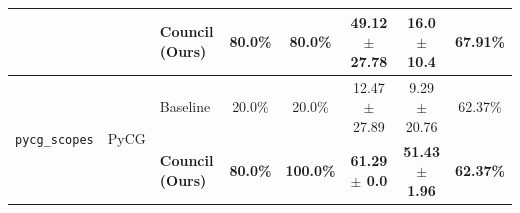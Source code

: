 \begin{table}[t]
\begin{tabular}{lll c c c c c}
 & & \textbf{Council (Ours)} & \textbf{80.0\%} & \textbf{80.0\%} & \textbf{49.12 $\pm$ 27.78} & \textbf{16.0 $\pm$ 10.4} & \textbf{67.91\%} \\
\midrule
\multirow{2}{*}{\texttt{pycg\_scopes}} & \multirow{2}{*}{PyCG} & Baseline & 20.0\% & 20.0\% & 12.47 $\pm$ 27.89 & 9.29 $\pm$ 20.76 & 62.37\% \\
 & & \textbf{Council (Ours)} & \textbf{80.0\%} & \textbf{100.0\%} & \textbf{61.29 $\pm$ 0.0} & \textbf{51.43 $\pm$ 1.96} & \textbf{62.37\%} \\
\bottomrule
\end{tabular}
\end{table}